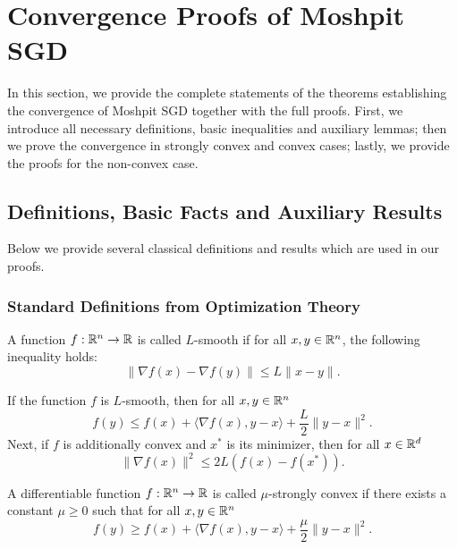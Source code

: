 \section{Convergence Proofs of Moshpit SGD}\label{sect:missing_proofs_local_sgd}
In this section, we provide the complete statements of the theorems establishing the convergence of Moshpit SGD together with the full proofs. First, we introduce all necessary definitions, basic inequalities and auxiliary lemmas; then we prove the convergence in strongly convex and convex cases; lastly, we provide the proofs for the non-convex case.

\subsection{Definitions, Basic Facts and Auxiliary Results}\label{sect:basic_facts}


Below we provide several classical definitions and results which are used in our proofs.

\subsubsection{Standard Definitions from Optimization Theory}

\begin{definition}[$L$-smoothness]\label{def:L_smoothness}
A function $f:\mathbb{R}^n \to \mathbb{R}$ is called $L$-smooth if for all $x,y\in \mathbb{R}^n$, the following inequality holds:
\begin{equation}
    \|\nabla f(x) - \nabla f(y)\| \le L\|x-y\|.\label{eq:L_smoothness_def}
\end{equation}
\end{definition}
If the function $f$ is $L$-smooth, then for all $x,y\in\mathbb{R}^n$
\begin{equation}
    f(y) \le f(x) + \langle\nabla f(x), y-x \rangle + \frac{L}{2}\|y-x\|^2. \label{eq:L_smoothness_cor}
\end{equation}
Next, if $f$ is additionally convex and $x^*$ is its minimizer, then for all $x\in\mathbb{R}^d$
\begin{equation}
    \|\nabla f(x)\|^2 \le 2L\left(f(x) - f(x^*)\right). \label{eq:L_smoothness_cor_2}
\end{equation}


\begin{definition}\label{def:str_cvx}
    A differentiable function $f:\mathbb{R}^n \to\mathbb{R}$ is called $\mu$-strongly convex if there exists a constant $\mu \ge 0$ such that for all $x,y\in \mathbb{R}^n$
    \begin{equation}
        f(y) \ge f(x) + \langle\nabla f(x), y-x \rangle + \frac{\mu}{2}\|y-x\|^2. \label{eq:str_cvx_def}
    \end{equation}
\end{definition}

